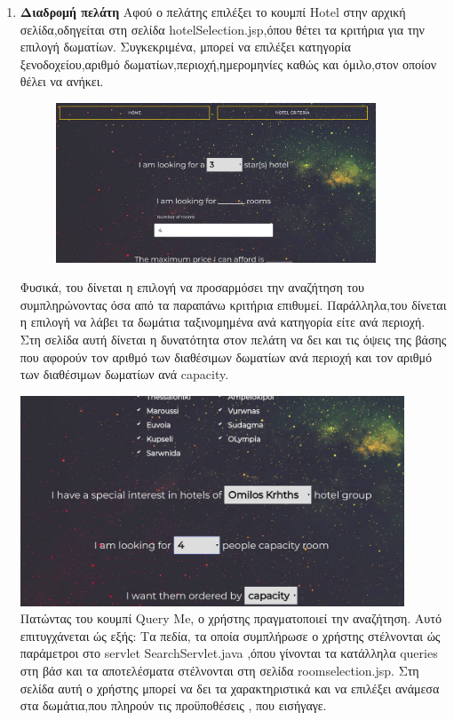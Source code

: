 \documentclass[a4paper,oneside, 11pt]{article}
\begin{document}
\begin{enumerate}
\item \textbf{Διαδρομή πελάτη} \bigbreak
Αφού ο πελάτης επιλέξει το κουμπί Hotel στην αρχική σελίδα,οδηγείται στη σελίδα 		hotelSelection.jsp,όπου θέτει τα κριτήρια για την επιλογή δωματίων. Συγκεκριμένα, μπορεί να επιλέξει κατηγορία ξενοδοχείου,αριθμό δωματίων,περιοχή,ημερομηνίες καθώς και όμιλο,στον οποίον θέλει να ανήκει.
\begin{figure}[h]
\center
\includegraphics[width=0.9\textwidth]{hotelSel1.jpg}
\end{figure}

Φυσικά, του δίνεται η επιλογή να προσαρμόσει την αναζήτηση του συμπληρώνοντας όσα από τα παραπάνω κριτήρια επιθυμεί. Παράλληλα,του δίνεται η επιλογή να λάβει τα δωμάτια ταξινομημένα  ανά κατηγορία είτε ανά περιοχή.
Στη σελίδα αυτή δίνεται η δυνατότητα στον πελάτη να δει και τις όψεις της βάσης που αφορούν τον αριθμό των διαθέσιμων δωματίων ανά περιοχή και τον αριθμό των διαθέσιμων δωματίων ανά capacity.

\includegraphics[width=0.9\textwidth]{hotelSel2.jpg}
\bigbreak
Πατώντας του κουμπί Query Me, ο χρήστης πραγματοποιεί την αναζήτηση. 
Αυτό επιτυγχάνεται ώς εξής: \bigbreak Τα πεδία, τα οποία συμπλήρωσε ο χρήστης στέλνονται ώς παράμετροι στο servlet SearchServlet.java ,όπου γίνονται τα κατάλληλα queries στη βάσ και τα αποτελέσματα στέλνονται στη σελίδα roomselection.jsp. Στη σελίδα αυτή ο χρήστης μπορεί να δει τα χαρακτηριστικά και να επιλέξει ανάμεσα στα δωμάτια,που πληρούν τις προϋποθέσεις , που εισήγαγε. 


\end{enumerate}
\end{document}
